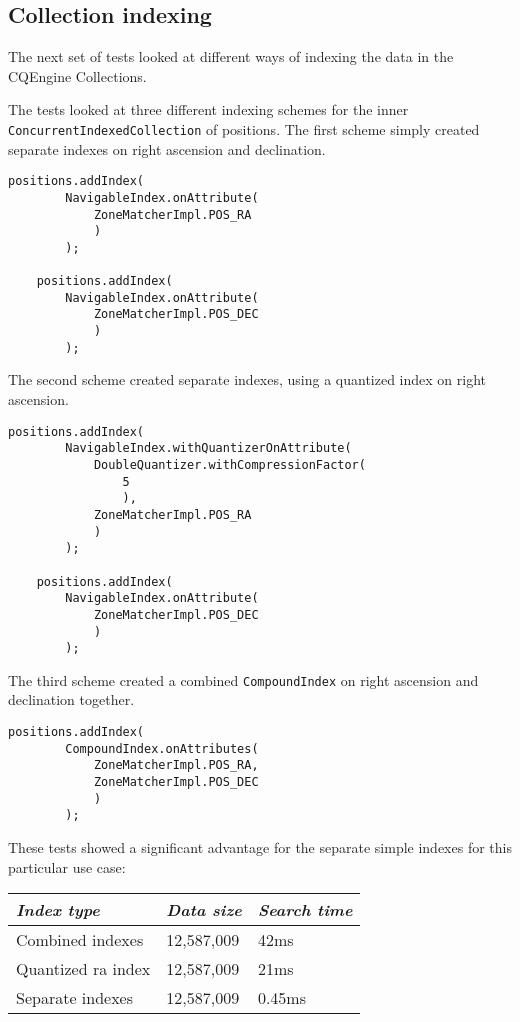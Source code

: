 \documentclass{article}
\newcommand{\cqengine} {CQEngine\xspace}
\begin{document}
\subsection{Collection indexing}
\label{cqengine-indexing}

The next set of tests looked at different ways of indexing the data in the \cqengine Collections.

The tests looked at three different indexing schemes for the inner \texttt{ConcurrentIndexedCollection} of positions. The first scheme simply created separate indexes on right ascension and declination.

\begin{lstlisting}[style=Java]
    positions.addIndex(
        NavigableIndex.onAttribute(
            ZoneMatcherImpl.POS_RA
            )
        );

    positions.addIndex(
        NavigableIndex.onAttribute(
            ZoneMatcherImpl.POS_DEC
            )
        );
\end{lstlisting}

The second scheme created separate indexes, using a quantized index on right ascension.

\begin{lstlisting}[style=Java]
    positions.addIndex(
        NavigableIndex.withQuantizerOnAttribute(
            DoubleQuantizer.withCompressionFactor(
                5
                ),
            ZoneMatcherImpl.POS_RA
            )
        );

    positions.addIndex(
        NavigableIndex.onAttribute(
            ZoneMatcherImpl.POS_DEC
            )
        );
\end{lstlisting}

The third scheme created a combined \texttt{CompoundIndex} on right ascension and declination together.

\begin{lstlisting}[style=Java]
    positions.addIndex(
        CompoundIndex.onAttributes(
            ZoneMatcherImpl.POS_RA,
            ZoneMatcherImpl.POS_DEC
            )
        );
\end{lstlisting}

These tests showed a significant advantage for the separate simple indexes for this particular use case:

\begin{table}[h]
\centering
\begin{tabular}{|l|l|l|}
\hline
\textit{Index type} & \textit{Data size} & \textit{Search time} \\ \hline
Combined indexes & 12,587,009 & 42ms \\ \hline
Quantized ra index & 12,587,009 & 21ms \\ \hline
Separate indexes & 12,587,009 & 0.45ms \\ \hline
\end{tabular}
\end{table}
\end{document}
